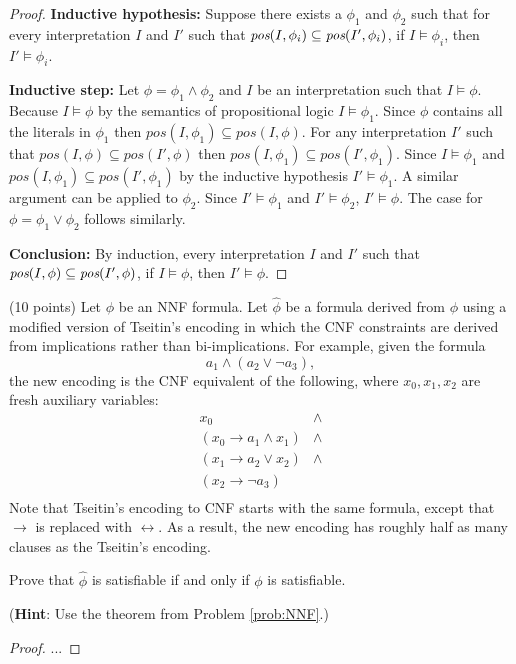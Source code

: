 \documentclass{article}
\newenvironment{solution}{\color{blue} \em }{}
\begin{document}
\begin{enumerate}
\begin{solution}
\begin{proof}
\item \textbf{Inductive hypothesis:} Suppose there exists a $\phi_1$ and $\phi_2$ such that for every interpretation $I$ and $I'$ such that $\emph{pos}(I, \phi_i) \subseteq \emph{pos}(I', \phi_i)$, if $I \models \phi_i$, then $I' \models \phi_i$.

\item \textbf{Inductive step:}
    Let $\phi = \phi_1 \land \phi_2$ and $I$ be an interpretation such that $I \models \phi$. Because $I \models \phi$ by the semantics of propositional logic $I \models \phi_1$. Since $\phi$ contains all the literals in $\phi_1$ then $pos(I, \phi_1) \subseteq pos(I, \phi)$. For any interpretation $I'$ such that $pos(I, \phi) \subseteq pos(I', \phi)$ then $pos(I, \phi_1) \subseteq pos(I', \phi_1)$.  Since $I \models \phi_1$ and $pos(I, \phi_1) \subseteq pos(I', \phi_1)$ by the inductive hypothesis $I' \models \phi_1$. A similar argument can be applied to $\phi_2$. Since $I' \models \phi_1$ and $I' \models \phi_2$, $I' \models \phi$.
The case for $\phi = \phi_1 \lor \phi_2$ follows similarly.

\item \textbf{Conclusion:} By induction, every interpretation $I$ and $I'$ such that $\emph{pos}(I, \phi) \subseteq \emph{pos}(I', \phi)$, if $I \models \phi$, then $I' \models \phi$.

\end{proof}
\end{solution}


\item (10 points) Let $\phi$ be an NNF formula.  Let $\hat{\phi}$ be a formula derived from $\phi$ using a modified version of Tseitin's encoding in which the CNF constraints are derived from implications rather than bi-implications.   For example, given the formula
\[a_1\land (a_2 \lor \neg a_3),\]
the new encoding is the CNF equivalent of the following, where $x_0, x_1, x_2$ are fresh auxiliary variables:
\[
\begin{array}{ll}
x_0 & \land \\
(x_0 \rightarrow a_1 \land x_1) & \land \\
(x_1 \rightarrow a_2 \lor x_2) & \land \\
(x_2 \rightarrow \neg a_3) &  \\
\end{array}
\]
Note that Tseitin's encoding to CNF starts with the same formula, except that $\rightarrow$ is replaced with $\leftrightarrow$.  As a result, the new encoding has roughly half as many clauses as the Tseitin's encoding.

\medskip
Prove that $\hat{\phi}$ is satisfiable if and only if $\phi$ is satisfiable.

\medskip
(\textbf{Hint}: Use the theorem from Problem \ref{prob:NNF}.)

\begin{solution}
	\begin{proof}
		...
	\end{proof}
\end{solution}

\end{enumerate}
\end{document}
